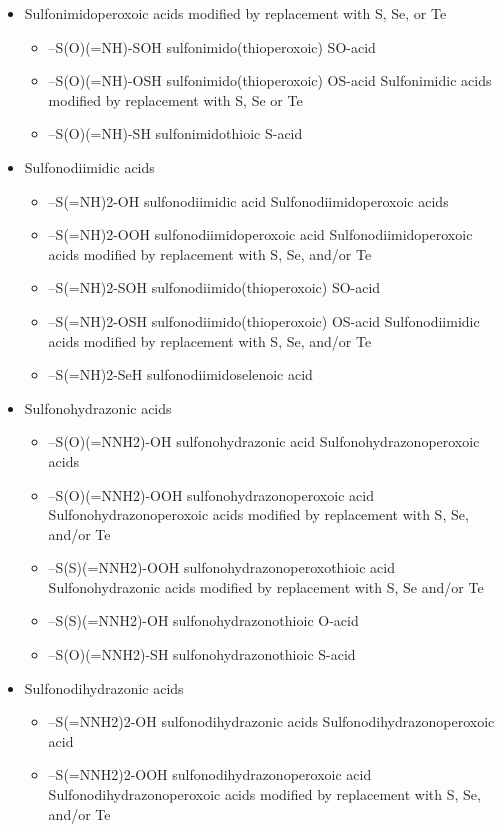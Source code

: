 \documentclass[a4paper,12pt]{report}
\begin{document}
\begin{itemize}
\begin{itemize}
\end{itemize}
\item Sulfonimidoperoxoic acids modified by replacement with S, Se, or Te 
\begin{itemize}
\item –S(O)(=NH)-SOH sulfonimido(thioperoxoic) SO-acid 
\item –S(O)(=NH)-OSH sulfonimido(thioperoxoic) OS-acid Sulfonimidic acids modified by replacement with S, Se or Te 
\item –S(O)(=NH)-SH sulfonimidothioic S-acid 
\end{itemize}
\item Sulfonodiimidic acids 
\begin{itemize}
\item –S(=NH)2-OH sulfonodiimidic acid Sulfonodiimidoperoxoic acids 
\item –S(=NH)2-OOH sulfonodiimidoperoxoic acid Sulfonodiimidoperoxoic acids modified by replacement with S, Se, and/or Te 
\item –S(=NH)2-SOH sulfonodiimido(thioperoxoic) SO-acid 
\item –S(=NH)2-OSH sulfonodiimido(thioperoxoic) OS-acid Sulfonodiimidic acids modified by replacement with S, Se, and/or Te 
\item –S(=NH)2-SeH sulfonodiimidoselenoic acid 
\end{itemize}
\item Sulfonohydrazonic acids 
\begin{itemize}
\item –S(O)(=NNH2)-OH sulfonohydrazonic acid Sulfonohydrazonoperoxoic acids 
\item –S(O)(=NNH2)-OOH sulfonohydrazonoperoxoic acid Sulfonohydrazonoperoxoic acids modified by replacement with S, Se, and/or Te 
\item –S(S)(=NNH2)-OOH sulfonohydrazonoperoxothioic acid Sulfonohydrazonic acids modified by replacement with S, Se and/or Te 
\item –S(S)(=NNH2)-OH sulfonohydrazonothioic O-acid 
\item –S(O)(=NNH2)-SH sulfonohydrazonothioic S-acid 
\end{itemize}
\item Sulfonodihydrazonic acids 
\begin{itemize}
\item –S(=NNH2)2-OH sulfonodihydrazonic acids Sulfonodihydrazonoperoxoic acid 
\item –S(=NNH2)2-OOH sulfonodihydrazonoperoxoic acid Sulfonodihydrazonoperoxoic acids modified by replacement with S, Se, and/or Te 

\end{itemize}
\end{itemize}
\end{document}
